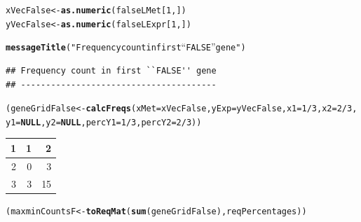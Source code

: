 \documentclass[a4paper,10pt]{article}\usepackage[]{graphicx}\usepackage[]{color}
\makeatletter
\newcommand{\hlnum}[1]{\textcolor[rgb]{0.686,0.059,0.569}{#1}}%
\newcommand{\hlstr}[1]{\textcolor[rgb]{0.192,0.494,0.8}{#1}}%
\newcommand{\hlopt}[1]{\textcolor[rgb]{0,0,0}{#1}}%
\newcommand{\hlstd}[1]{\textcolor[rgb]{0.345,0.345,0.345}{#1}}%
\newcommand{\hlkwa}[1]{\textcolor[rgb]{0.161,0.373,0.58}{\textbf{#1}}}%
\newcommand{\hlkwb}[1]{\textcolor[rgb]{0.69,0.353,0.396}{#1}}%
\newcommand{\hlkwc}[1]{\textcolor[rgb]{0.333,0.667,0.333}{#1}}%
\newcommand{\hlkwd}[1]{\textcolor[rgb]{0.737,0.353,0.396}{\textbf{#1}}}%
\newenvironment{kframe}{%
 \def\at@end@of@kframe{}%
 \ifinner\ifhmode%
  \def\at@end@of@kframe{\end{minipage}}%
  \begin{minipage}{\columnwidth}%
 \fi\fi%
 \def\FrameCommand##1{\hskip\@totalleftmargin \hskip-\fboxsep
 \colorbox{shadecolor}{##1}\hskip-\fboxsep
     \hskip-\linewidth \hskip-\@totalleftmargin \hskip\columnwidth}%
 \MakeFramed {\advance\hsize-\width
   \@totalleftmargin\z@ \linewidth\hsize
   \@setminipage}}%
 {\par\unskip\endMakeFramed%
 \at@end@of@kframe}
\newenvironment{knitrout}{}{} %
\makeatother
\begin{document}
\begin{knitrout}
\color{fgcolor}\begin{kframe}
\begin{alltt}
\hlstd{xVecFalse}\hlkwb{<-} \hlkwd{as.numeric}\hlstd{(falseLMet[}\hlnum{1}\hlstd{,])}
\hlstd{yVecFalse}\hlkwb{<-} \hlkwd{as.numeric}\hlstd{(falseLExpr[}\hlnum{1}\hlstd{,])}

\hlkwd{messageTitle}\hlstd{(}\hlstr{"Frequency count in first ``FALSE'' gene"}\hlstd{)}
\end{alltt}
\begin{verbatim}
## Frequency count in first ``FALSE'' gene 
## ---------------------------------------
\end{verbatim}
\begin{alltt}
\hlstd{(geneGridFalse} \hlkwb{<-} \hlkwd{calcFreqs}\hlstd{(}\hlkwc{xMet}\hlstd{=xVecFalse,} \hlkwc{yExp}\hlstd{=yVecFalse,} \hlkwc{x1}\hlstd{=}\hlnum{1}\hlopt{/}\hlnum{3}\hlstd{,} \hlkwc{x2}\hlstd{=}\hlnum{2}\hlopt{/}\hlnum{3}\hlstd{,}
                          \hlkwc{y1}\hlstd{=}\hlkwa{NULL}\hlstd{,} \hlkwc{y2}\hlstd{=}\hlkwa{NULL}\hlstd{,} \hlkwc{percY1}\hlstd{=}\hlnum{1}\hlopt{/}\hlnum{3}\hlstd{,} \hlkwc{percY2}\hlstd{=}\hlnum{2}\hlopt{/}\hlnum{3}\hlstd{))}
\end{alltt}
\end{kframe}


\begin{tabular}{r|r|r}
\hline
1 & 1 & 2\\
\hline
2 & 0 & 3\\
\hline
3 & 3 & 15\\
\hline
\end{tabular}\begin{kframe}\begin{alltt}
\hlstd{(maxminCountsF} \hlkwb{<-} \hlkwd{toReqMat} \hlstd{(}\hlkwd{sum}\hlstd{(geneGridFalse), reqPercentages))}
\end{alltt}
\end{kframe}



\end{knitrout}
\end{document}
